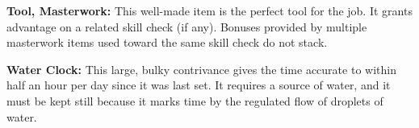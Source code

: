 \textbf{Tool, Masterwork:} This well-made item is the perfect tool for the job. It grants advantage on a related skill check (if any). Bonuses provided by multiple masterwork items used toward the same skill check do not stack.

\textbf{Water Clock:} This large, bulky contrivance gives the time accurate to within half an hour per day since it was last set. It requires a source of water, and it must be kept still because it marks time by the regulated flow of droplets of water.